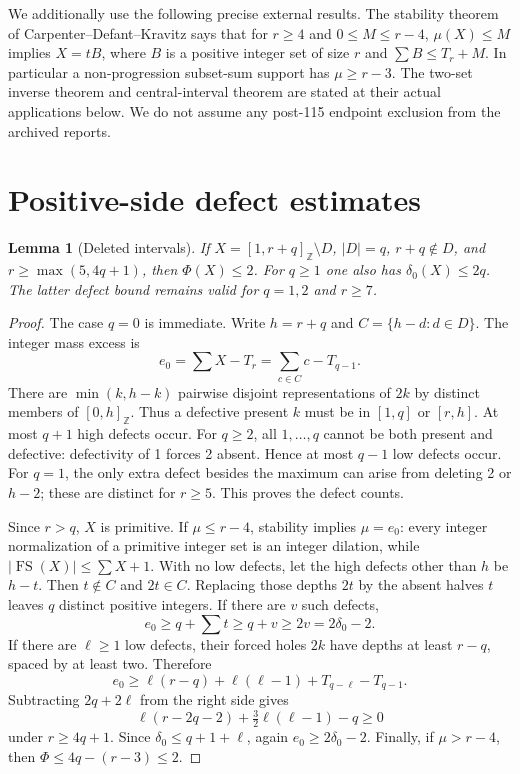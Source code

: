 \documentclass[11pt,a4paper]{article}
\newcommand{\FS}{\operatorname{FS}}
\newcommand{\Z}{\mathbb Z}
\newtheorem{lemma}[theorem]{Lemma}
\begin{document}
We additionally use the following precise external results. The stability
theorem of Carpenter--Defant--Kravitz \cite[Theorem 1.1]{CDK} says that for
$r\ge4$ and $0\le M\le r-4$, $\mu(X)\le M$ implies
$X=tB$, where $B$ is a positive integer set of size $r$ and
$\sum B\le T_r+M$. In particular a non-progression subset-sum support
has $\mu\ge r-3$. The two-set inverse theorem and central-interval theorem
are stated at their actual applications below. We do not assume any
post-115 endpoint exclusion from the archived reports.

\section{Positive-side defect estimates}
\begin{lemma}[Deleted intervals]\label{lem:deleted}
If $X=[1,r+q]_{\Z}\setminus D$, $|D|=q$, $r+q\notin D$, and
$r\ge\max(5,4q+1)$, then $\Phi(X)\le2$. For $q\ge1$ one also has
$\delta_0(X)\le2q$. The latter defect bound remains valid for $q=1,2$
and $r\ge7$.
\end{lemma}
\begin{proof}
The case $q=0$ is immediate. Write $h=r+q$ and
$C=\{h-d:d\in D\}$. The integer mass excess is
\[
 e_0=\sum X-T_r=\sum_{c\in C}c-T_{q-1}.
\]
There are $\min(k,h-k)$ pairwise disjoint representations of $2k$ by
distinct members of $[0,h]_{\Z}$. Thus a defective present $k$ must be
in $[1,q]$ or $[r,h]$. At most $q+1$ high defects occur. For $q\ge2$,
all $1,\ldots,q$ cannot be both present and defective: defectivity of 1
forces 2 absent. Hence at most $q-1$ low defects occur. For $q=1$,
the only extra defect besides the maximum can arise from deleting 2 or
$h-2$; these are distinct for $r\ge5$. This proves the defect counts.

Since $r>q$, $X$ is primitive. If $\mu\le r-4$, stability implies
$\mu=e_0$: every integer normalization of a primitive integer set is an
integer dilation, while $|\FS(X)|\le\sum X+1$. With no low defects, let
the high defects other than $h$ be $h-t$. Then $t\notin C$ and $2t\in C$.
Replacing those depths $2t$ by the absent halves $t$ leaves $q$ distinct
positive integers. If there are $v$ such defects,
\[
 e_0\ge q+\sum t\ge q+v\ge2v=2\delta_0-2.
\]
If there are $\ell\ge1$ low defects, their forced holes $2k$ have depths
at least $r-q$, spaced by at least two. Therefore
\[
 e_0\ge\ell(r-q)+\ell(\ell-1)+T_{q-\ell}-T_{q-1}.
\]
Subtracting $2q+2\ell$ from the right side gives
\[
 \ell(r-2q-2)+\tfrac32\ell(\ell-1)-q\ge0
\]
under $r\ge4q+1$. Since $\delta_0\le q+1+\ell$, again
$e_0\ge2\delta_0-2$. Finally, if $\mu>r-4$, then
$\Phi\le4q-(r-3)\le2$.
\end{proof}
\end{document}
